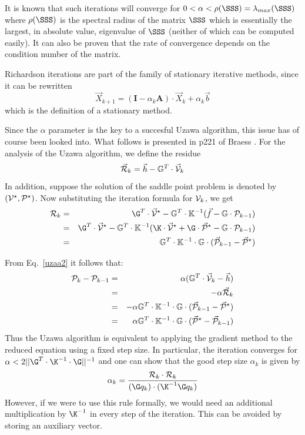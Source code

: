It is known that such iterations will converge for $0< \alpha < \rho(\SSS)= \lambda_{max}(\SSS)$ 
where $\rho(\SSS)$ is the spectral radius of the matrix $\SSS$
which is essentially the largest, in absolute value, eigenvalue of $\SSS$ (neither of which 
can be computed easily).  
It can also be proven that the rate of convergence depends on the condition number of the matrix.

Richardson iterations are part of the family of stationary iterative methods, since it can be rewritten 
\begin{equation}
{\vec X}_{k+1} = ({\bm I} - \alpha_k {\bm A} ) \cdot {\vec X}_k + \alpha_k {\vec b}
\end{equation}
which is the definition of a stationary method. 

Since the $\alpha$ parameter is the key to a succesful Uzawa algorithm, 
this issue has of course been looked into. What follows is 
presented in p221 of Braess \cite{braess}.
For the analysis of the Uzawa algorithm, we define the residue
\[
\vec {\cal R}_k = \vec h - \mathbb{G}^T \cdot \vec{\cal V}_k
\]
In addition, suppose the solution of the saddle point problem is denoted
by $({\cal V}^\star,{\cal P}^\star)$.
Now substituting the iteration formula for ${\cal V}_k$, we get
\begin{eqnarray}
{\cal R}_k 
&=& \G^T\cdot\vec{\cal V}^\star -\mathbb{G}^T\cdot \mathbb{K}^{-1} (\vec f - \mathbb{G}\cdot {\cal P}_{k-1}) \\
&=& \G^T\cdot\vec{\cal V}^\star -\mathbb{G}^T\cdot \mathbb{K}^{-1} (\K\cdot\vec{\cal V}^\star + \G\cdot\vec{\cal P}^\star - \mathbb{G}\cdot {\cal P}_{k-1}) \\
&=& \mathbb{G}^T \cdot \mathbb{K}^{-1} \cdot \mathbb{G}\cdot (\vec {\cal P}_{k-1} - \vec{\cal P}^\star) 
\end{eqnarray}

From Eq.~\eqref{uzaa2} it follows that:
\begin{eqnarray}
{\cal P}_k - {\cal P}_{k-1}  
&=& \alpha (\mathbb{G}^T\cdot \vec{\cal V}_k -\vec h) \\
&=& -\alpha \vec{\cal R}_k \\ 
&=& -\alpha \mathbb{G}^T \cdot \mathbb{K}^{-1} \cdot \mathbb{G}\cdot (\vec {\cal P}_{k-1} - \vec{\cal P}^\star)\\ 
&=& \alpha \mathbb{G}^T \cdot \mathbb{K}^{-1} \cdot \mathbb{G}\cdot 
(\vec{\cal P}^\star - \vec {\cal P}_{k-1} ) 
\end{eqnarray}
Thus the Uzawa algorithm is equivalent to applying the gradient method 
to the reduced equation using a fixed step size. 
In particular, the iteration converges for
$
\alpha < 2 || \G^T \cdot \K^{-1} \cdot \G ||^{-1}
$
and one can show that the good step size $\alpha_k$ is given by 
\begin{equation}
\alpha_k = \frac{{\cal R}_k \cdot {\cal R}_k}{(\G q_k)\cdot (\K^{-1} \G q_k)}
\label{uzaa3}
\end{equation}
However, if we were to use this rule formally, we would 
need an additional multiplication by $\K^{-1}$ in every step 
of the iteration. This can be avoided by storing an 
auxiliary vector. 


